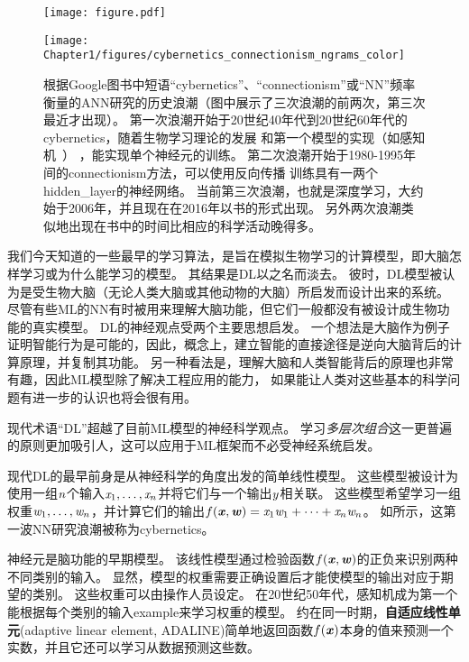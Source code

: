 \begin{figure}[!htb]
\ifOpenSource
\centerline{\texttt{[image: figure.pdf]}}
\else
\centerline{\texttt{[image: Chapter1/figures/cybernetics\_connectionism\_ngrams\_color]}}
\fi
\caption{根据Google图书中短语``\gls{cybernetics}''、``\gls{connectionism}''或``\gls{NN}''频率衡量的\gls{ANN}研究的历史浪潮（图中展示了三次浪潮的前两次，第三次最近才出现）。
第一次浪潮开始于20世纪40年代到20世纪60年代的\gls{cybernetics}，随着生物学习理论的发展\citep{McCulloch43,Hebb49}
和第一个模型的实现（如感知机~\citep{Rosenblatt-1958}） ，能实现单个神经元的训练。
第二次浪潮开始于1980-1995年间的\gls{connectionism}方法，可以使用反向传播\citep{Rumelhart86b-small} 训练具有一两个\gls{hidden_layer}的神经网络。
当前第三次浪潮，也就是深度学习，大约始于2006年\citep{Hinton06,Bengio-nips-2006-small,ranzato-07-small}，并且现在在2016年以书的形式出现。
另外两次浪潮类似地出现在书中的时间比相应的科学活动晚得多。
}
\label{fig:chap1_cybernetics_connectionism_ngrams_color}
\end{figure}


我们今天知道的一些最早的学习算法，是旨在模拟生物学习的计算模型，即大脑怎样学习或为什么能学习的模型。
其结果是\gls{DL}以之名而淡去。
彼时，\gls{DL}模型被认为是受生物大脑（无论人类大脑或其他动物的大脑）所启发而设计出来的系统。
尽管有些\gls{ML}的\gls{NN}有时被用来理解大脑功能\citep{hinton1991lesioning}，但它们一般都没有被设计成生物功能的真实模型。
\gls{DL}的神经观点受两个主要思想启发。
一个想法是大脑作为例子证明智能行为是可能的，因此，概念上，建立智能的直接途径是逆向大脑背后的计算原理，并复制其功能。
另一种看法是，理解大脑和人类智能背后的原理也非常有趣，因此\gls{ML}模型除了解决工程应用的能力， 如果能让人类对这些基本的科学问题有进一步的认识也将会很有用。

  
现代术语``\gls{DL}''超越了目前\gls{ML}模型的神经科学观点。
学习\emph{多层次组合}这一更普遍的原则更加吸引人，这可以应用于\gls{ML}框架而不必受神经系统启发。
 
 
现代\gls{DL}的最早前身是从神经科学的角度出发的简单线性模型。
这些模型被设计为使用一组$\mathit{n}$个输入$\mathit{x}_1, \dots ,\mathit{x}_n$并将它们与一个输出$\mathit{y}$相关联。 
这些模型希望学习一组权重$\mathit{w}_1, \dots, \mathit{w}_n $，并计算它们的输出$f(\boldsymbol{\mathit{x}}, \boldsymbol{\mathit{w}}) = \mathit{x}_1 \mathit{w}_1 + \dots + \mathit{x}_n \mathit{w}_n$。
如所示，这第一波\gls{NN}研究浪潮被称为\gls{cybernetics}。

神经元\citep{McCulloch43}是脑功能的早期模型。
该线性模型通过检验函数$f(\boldsymbol{\mathit{x}},\boldsymbol{\mathit{w}})$的正负来识别两种不同类别的输入。
显然，模型的权重需要正确设置后才能使模型的输出对应于期望的类别。
这些权重可以由操作人员设定。
在20世纪50年代，感知机\citep{Rosenblatt-1956,Rosenblatt-1958}成为第一个能根据每个类别的输入\gls{example}来学习权重的模型。
约在同一时期，\textbf{自适应线性单元}(adaptive linear element, ADALINE)简单地返回函数$f(\boldsymbol{\mathit{x}})$本身的值来预测一个实数\citep{Widrow60}，并且它还可以学习从数据预测这些数。

